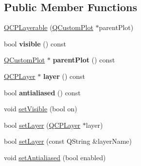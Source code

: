 \subsection*{Public Member Functions}
\begin{DoxyCompactItemize}
\item 
\hyperlink{classQCPLayerable_a13db44e350bb2c681d2e31e2208e23f9}{Q\-C\-P\-Layerable} (\hyperlink{classQCustomPlot}{Q\-Custom\-Plot} $\ast$parent\-Plot)
\item 
\hypertarget{classQCPLayerable_a10a3cc92e0fa63e4a929e61d34e275a7}{bool {\bfseries visible} () const }\label{classQCPLayerable_a10a3cc92e0fa63e4a929e61d34e275a7}

\item 
\hypertarget{classQCPLayerable_ab7e0e94461566093d36ffc0f5312b109}{\hyperlink{classQCustomPlot}{Q\-Custom\-Plot} $\ast$ {\bfseries parent\-Plot} () const }\label{classQCPLayerable_ab7e0e94461566093d36ffc0f5312b109}

\item 
\hypertarget{classQCPLayerable_aea67e8c19145e70d68c286a36f6b8300}{\hyperlink{classQCPLayer}{Q\-C\-P\-Layer} $\ast$ {\bfseries layer} () const }\label{classQCPLayerable_aea67e8c19145e70d68c286a36f6b8300}

\item 
\hypertarget{classQCPLayerable_aef5cb4aa899ed9dc9384fd614560291e}{bool {\bfseries antialiased} () const }\label{classQCPLayerable_aef5cb4aa899ed9dc9384fd614560291e}

\item 
void \hyperlink{classQCPLayerable_a3bed99ddc396b48ce3ebfdc0418744f8}{set\-Visible} (bool on)
\item 
bool \hyperlink{classQCPLayerable_ab0d0da6d2de45a118886d2c8e16d5a54}{set\-Layer} (\hyperlink{classQCPLayer}{Q\-C\-P\-Layer} $\ast$layer)
\item 
bool \hyperlink{classQCPLayerable_ab25a0e7b897993b44447caee0f142083}{set\-Layer} (const Q\-String \&layer\-Name)
\item 
void \hyperlink{classQCPLayerable_a4fd43e89be4a553ead41652565ff0581}{set\-Antialiased} (bool enabled)
\end{DoxyCompactItemize}

